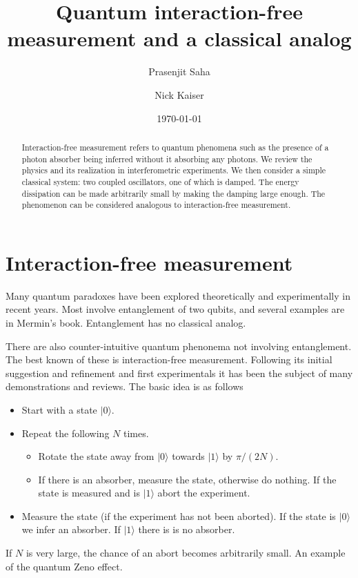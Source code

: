 \documentclass[12pt,aps,prb,preprint]{revtex4}
\def\ket#1{|#1\rangle}
\begin{document}
\title{Quantum interaction-free measurement and a classical analog}

\author{Prasenjit Saha}
\author{Nick Kaiser}

\date{\today}

\begin{abstract}
Interaction-free measurement refers to quantum phenomena such as the
presence of a photon absorber being inferred without it absorbing any
photons.  We review the physics and its realization in interferometric
experiments.  We then consider a simple classical system: two coupled
oscillators, one of which is damped.  The energy dissipation can be
made arbitrarily small by making the damping large enough.  The
phenomenon can be considered analogous to interaction-free
measurement.
\end{abstract}

\maketitle

\section{Interaction-free measurement}

Many quantum paradoxes have been explored theoretically and
experimentally in recent years.  Most involve entanglement of two
qubits, and several examples are in Mermin's
book\cite{2007qucosc.book}.  Entanglement has no classical analog.

There are also counter-intuitive quantum phenonema not involving
entanglement.  The best known of these is interaction-free
measurement. Following its initial
suggestion\cite{1993FoPh...23..987E} and refinement and first
experimentals\cite{PhysRevLett.74.4763} it has been the subject of
many demonstrations\cite{voorthuysen:1504,2006JPhB...39.3177N} and
reviews.\cite{deweerd:272} The basic idea is as follows
\begin{itemize}
\item Start with a state $\ket0$.
\item Repeat the following $N$ times.
\begin{itemize}
\item Rotate the state away from $\ket0$ towards $\ket1$ by $\pi/(2N)$.
\item If there is an absorber, measure the state, otherwise do
  nothing. If the state is measured and is $\ket1$ abort the
  experiment.
\end{itemize}
\item Measure the state (if the experiment has not been aborted).  If
  the state is $\ket0$ we infer an absorber. If $\ket1$ there is is no
  absorber.
\end{itemize}
If $N$ is very large, the chance of an abort becomes arbitrarily
small.  An example of the quantum Zeno effect.
\end{document}

